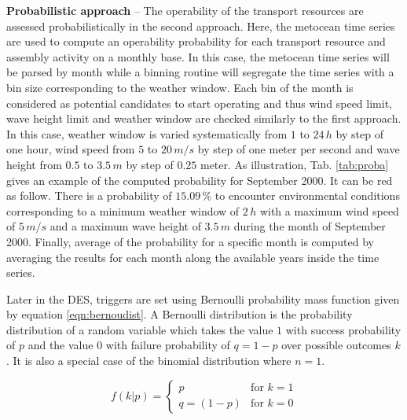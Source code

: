 \textbf{Probabilistic approach} -- The operability of the transport resources are assessed probabilistically in the second approach. Here, the metocean time series are used to compute an operability probability for each transport resource and assembly activity on a monthly base. In this case, the metocean time series will be parsed by month while a binning routine will segregate the time series with a bin size corresponding to the weather window. Each bin of the month is considered as potential candidates to start operating and thus wind speed limit, wave height limit and weather window are checked similarly to the first approach. In this case, weather window is varied systematically from $1$ to $24\, h$ by step of one hour, wind speed from $5$ to $20\, m/s$ by step of one meter per second and wave height from $0.5$ to $3.5\, m$ by step of $0.25$ meter. As illustration, Tab. \ref{tab:proba} gives an example of the computed probability for September 2000. It can be red as follow. There is a probability of $15.09\, \%$ to encounter environmental conditions corresponding to a minimum weather window of $2\, h$ with a maximum wind speed of $5\, m/s$ and a maximum wave height of $3.5\, m$ during the month of September 2000. Finally, average of the probability for a specific month is computed by averaging the results for each month along the available years inside the time series.


Later in the DES, triggers are set using Bernoulli probability mass function given by equation \ref{eqn:bernoudist}. A Bernoulli distribution is the probability distribution of a random variable which takes the value $1$ with success probability of $p$ and the value $0$ with failure probability of $q=1-p$ over possible outcomes $k$. It is also a special case of the binomial distribution where $n=1$.

\begin{equation}
\label{eqn:bernoudist}
f\left(k \vert p \right) = \begin{cases} p & \text{for $k=1$} \\ q=(1-p) & \text{for $k=0$} \end{cases}
\end{equation}

